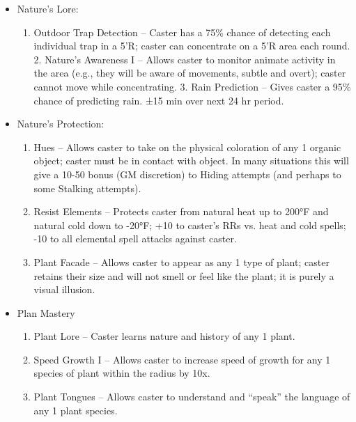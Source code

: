 \documentclass[oneside,12pt]{book}
\begin{document}
\begin{flushleft}
\begin{description}
{\begin{itemize}
\begin{enumerate}
\end{enumerate}
\item Nature's Lore:
\begin{enumerate}
\scriptsize
\item Outdoor Trap Detection – Caster has a 75\% chance of
detecting each individual trap in a 5’R; caster can
concentrate on a 5’R area each round.
2. Nature’s Awareness I – Allows caster to monitor
animate activity in the area (e.g., they will be aware of
movements, subtle and overt); caster cannot move
while concentrating.
3. Rain Prediction – Gives caster a 95\% chance of
predicting rain. ±15 min over next 24 hr period.
\end{enumerate}
\item Nature's Protection:
\begin{enumerate}
\scriptsize
\item Hues – Allows caster to take on the physical coloration of
any 1 organic object; caster must be in contact with
object. In many situations this will give a 10-50 bonus
(GM discretion) to Hiding attempts (and perhaps to
some Stalking attempts).
\item Resist Elements – Protects caster from natural heat up
to 200°F and natural cold down to -20°F; +10 to
caster’s RRs vs. heat and cold spells; -10 to all
elemental spell attacks against caster.
\item Plant Facade – Allows caster to appear as any 1 type of
plant; caster retains their size and will not smell or feel
like the plant; it is purely a visual illusion.
\end{enumerate}
\item Plan Mastery
\begin{enumerate}
\scriptsize
\item Plant Lore – Caster learns nature and history of any 1
plant.
\item Speed Growth I – Allows caster to increase speed of growth
for any 1 species of plant within the radius by 10x.
\item Plant Tongues – Allows caster to understand and “speak”
the language of any 1 plant species.
\end{enumerate}
\end{itemize}
}
\end{description}

\end{flushleft}
\end{document}
